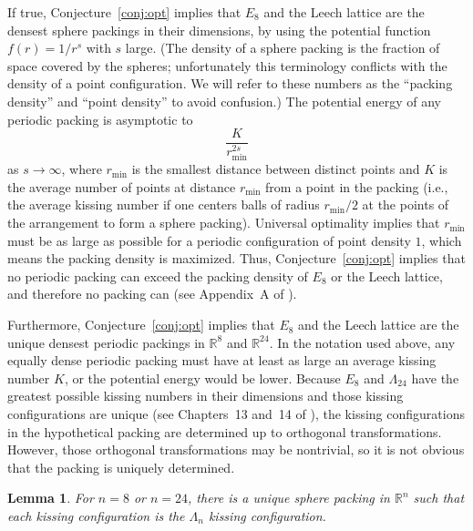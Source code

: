 \documentclass{jams-l}
\theoremstyle{plain}
\newtheorem{lemma}[theorem]{Lemma}
\numberwithin{theorem}{section}
\theoremstyle{definition}
\numberwithin{equation}{section}
\newcommand{\R}{{\mathbb R}}
\begin{document}
If true, Conjecture~\ref{conj:opt} implies that $E_8$ and the
Leech lattice are the densest sphere packings in their dimensions,
by using the potential function $f(r) = 1/r^s$ with $s$ large.
(The density of a sphere packing is the fraction of space covered
by the spheres; unfortunately this terminology conflicts with the
density of a point configuration.  We will refer to these numbers
as the ``packing density'' and ``point density'' to avoid
confusion.) The potential energy of any periodic packing is
asymptotic to
$$
\frac{K}{r_{\min}^{2s}}
$$
as $s \to \infty$, where $r_{\min}$ is the smallest distance
between distinct points and $K$ is the average number of points at
distance $r_{\min}$ from a point in the packing (i.e., the average
kissing number if one centers balls of radius $r_{\min}/2$ at the
points of the arrangement to form a sphere packing). Universal
optimality implies that $r_{\min}$ must be as large as possible
for a periodic configuration of point density $1$, which means the
packing density is maximized.  Thus, Conjecture~\ref{conj:opt}
implies that no periodic packing can exceed the packing density of
$E_8$ or the Leech lattice, and therefore no packing can (see
Appendix~A of \cite{CE}).

Furthermore, Conjecture~\ref{conj:opt} implies that $E_8$ and the
Leech lattice are the unique densest periodic packings in $\R^8$
and $\R^{24}$.  In the notation used above, any equally dense
periodic packing must have at least as large an average kissing
number $K$, or the potential energy would be lower.  Because $E_8$
and $\Lambda_{24}$ have the greatest possible kissing numbers in
their dimensions and those kissing configurations are unique (see
Chapters~13 and~14 of \cite{CS}), the kissing configurations in
the hypothetical packing are determined up to orthogonal
transformations.  However, those orthogonal transformations may be
nontrivial, so it is not obvious that the packing is uniquely
determined.

\begin{lemma} \label{lemma:unique}
For $n=8$ or $n=24$, there is a unique sphere packing in $\R^n$
such that each kissing configuration is the $\Lambda_n$ kissing
configuration.
\end{lemma}
\end{document}
